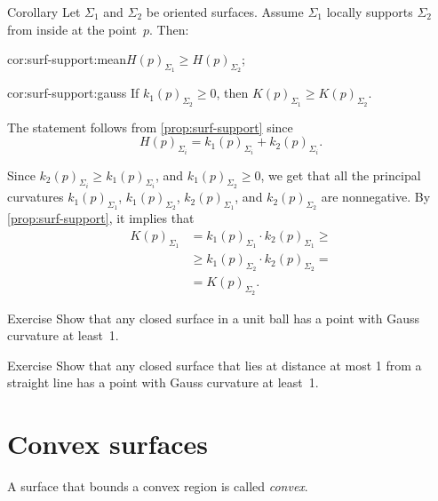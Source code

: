 \begin{thm}{Corollary}\label{cor:surf-support}
Let $\Sigma_1$ and $\Sigma_2$ be oriented surfaces.
Assume $\Sigma_1$ locally supports $\Sigma_2$ from inside at the point~$p$.
Then:

\begin{subthm}{cor:surf-support:mean}$H(p)_{\Sigma_1}\ge H(p)_{\Sigma_2}$;
\end{subthm}

\begin{subthm}{cor:surf-support:gauss} If $k_1(p)_{\Sigma_2}\ge 0$, then $K(p)_{\Sigma_1}\ge K(p)_{\Sigma_2}$.
\end{subthm}
 
\end{thm}

The statement follows from  \ref{prop:surf-support} since 
\[H(p)_{\Sigma_i}=k_1(p)_{\Sigma_i}+k_2(p)_{\Sigma_i}.\]


 Since $k_2(p)_{\Sigma_i}\ge k_1(p)_{\Sigma_i}$, and $k_1(p)_{\Sigma_2}\ge 0$, we get that all the principal curvatures 
$k_1(p)_{\Sigma_1}$, 
$k_1(p)_{\Sigma_2}$, 
$k_2(p)_{\Sigma_1}$, and 
$k_2(p)_{\Sigma_2}$ are nonnegative.
By \ref{prop:surf-support}, it implies that
\begin{align*}
K(p)_{\Sigma_1}&=k_1(p)_{\Sigma_1}\cdot k_2(p)_{\Sigma_1}\ge 
\\
&\ge k_1(p)_{\Sigma_2}\cdot k_2(p)_{\Sigma_2}=
\\
&=K(p)_{\Sigma_2}.
\end{align*}
\qedsf

\begin{thm}{Exercise}\label{ex:positive-gauss-0}
Show that any closed surface in a unit ball has a point with Gauss curvature at least~1.
\end{thm}

\begin{thm}{Exercise}\label{ex:positive-gauss}
Show that any closed surface that lies at distance at most 1 from a straight line has a point with Gauss curvature at least~1.
\end{thm}

\section{Convex surfaces}

A surface that bounds a convex region is called \emph{convex}.

